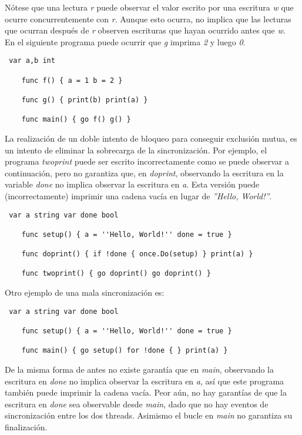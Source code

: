 Nótese que una lectura \textit{r} puede observar el valor escrito por una
escritura \textit{w} que ocurre concurrentemente con \textit{r}. Aunque esto
ocurra, no implica que las lecturas que ocurran después de \textit{r} observen
escrituras que hayan ocurrido antes que \textit{w}.\\

En el siguiente programa puede ocurrir que \textit{g} imprima \textit{2} y luego
\textit{0}.  \clearpage \begin{verbatim} var a,b int
    
	func f() { a = 1 b = 2 }
    
	func g() { print(b) print(a) }
    
	func main() { go f() g() } \end{verbatim}

La realización de un doble intento de bloqueo para conseguir exclusión mutua, es
un intento de eliminar la sobrecarga de la sincronización. Por ejemplo, el
programa \textit{twoprint} puede ser escrito incorrectamente como se puede
observar a continuación, pero no garantiza que, en \textit{doprint}, observando
la escritura en la variable \textit{done} no implica observar la escritura en
\textit{a}. Esta versión puede (incorrectamente) imprimir una cadena vacía en
lugar de \textit{''Hello, World!''}.

\begin{verbatim} var a string var done bool
    
	func setup() { a = ''Hello, World!'' done = true }
    
	func doprint() { if !done { once.Do(setup) } print(a) }
    
	func twoprint() { go doprint() go doprint() } \end{verbatim} \clearpage Otro
	ejemplo de una mala sincronización es:

\begin{verbatim} var a string var done bool
    
	func setup() { a = ''Hello, World!'' done = true }
    
	func main() { go setup() for !done { } print(a) } \end{verbatim}
    
De la misma forma de antes no existe garantía que en \textit{main}, observando
la escritura en \textit{done} no implica observar la escritura en \textit{a},
así que este programa también puede imprimir la cadena vacía. Peor aún, no hay
garantías de que la escritura en \textit{done} sea observable desde
\textit{main}, dado que no hay eventos de sincronización entre los dos threads.
Asimismo el bucle en \textit{main} no garantiza su finalización.\\
    

